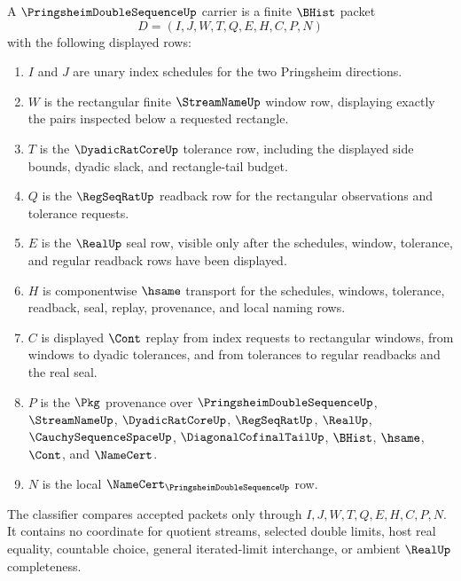 \begin{definition}
\label{def:pringsheim-double-sequence-carrier}
A $\PringsheimDoubleSequenceUp$ carrier is a finite $\BHist$ packet
$$
D=(I,J,W,T,Q,E,H,C,P,N)
$$
with the following displayed rows:
\begin{enumerate}
\item $I$ and $J$ are unary index schedules for the two Pringsheim directions.
\item $W$ is the rectangular finite $\StreamNameUp$ window row, displaying exactly the pairs inspected below a requested rectangle.
\item $T$ is the $\DyadicRatCoreUp$ tolerance row, including the displayed side bounds, dyadic slack, and rectangle-tail budget.
\item $Q$ is the $\RegSeqRatUp$ readback row for the rectangular observations and tolerance requests.
\item $E$ is the $\RealUp$ seal row, visible only after the schedules, window, tolerance, and regular readback rows have been displayed.
\item $H$ is componentwise $\hsame$ transport for the schedules, windows, tolerance, readback, seal, replay, provenance, and local naming rows.
\item $C$ is displayed $\Cont$ replay from index requests to rectangular windows, from windows to dyadic tolerances, and from tolerances to regular readbacks and the real seal.
\item $P$ is the $\Pkg$ provenance over $\PringsheimDoubleSequenceUp$, $\StreamNameUp$, $\DyadicRatCoreUp$, $\RegSeqRatUp$, $\RealUp$, $\CauchySequenceSpaceUp$, $\DiagonalCofinalTailUp$, $\BHist$, $\hsame$, $\Cont$, and $\NameCert$.
\item $N$ is the local $\NameCert_{\PringsheimDoubleSequenceUp}$ row.
\end{enumerate}
The classifier compares accepted packets only through $I,J,W,T,Q,E,H,C,P,N$. It contains no coordinate for quotient streams, selected double limits, host real equality, countable choice, general iterated-limit interchange, or ambient $\RealUp$ completeness.
\end{definition}

